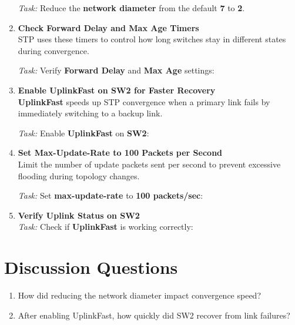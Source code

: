 \documentclass[a4paper]{book}
\begin{document}
\begin{enumerate}
    \textit{Task:} Reduce the \textbf{network diameter} from the default \textbf{7} to \textbf{2}.

    \item \textbf{Check Forward Delay and Max Age Timers} \\
    STP uses these timers to control how long switches stay in different states during convergence.

    \textit{Task:} Verify \textbf{Forward Delay} and \textbf{Max Age} settings:

    \item \textbf{Enable UplinkFast on SW2 for Faster Recovery} \\
    \textbf{UplinkFast} speeds up STP convergence when a primary link fails by immediately switching to a backup link.

    \textit{Task:} Enable \textbf{UplinkFast} on \textbf{SW2}:

    \item \textbf{Set Max-Update-Rate to 100 Packets per Second} \\
    Limit the number of update packets sent per second to prevent excessive flooding during topology changes.

    \textit{Task:} Set \textbf{max-update-rate} to \textbf{100 packets/sec}:


    \item \textbf{Verify Uplink Status on SW2} \\
    \textit{Task:} Check if \textbf{UplinkFast} is working correctly:

\end{enumerate}

\section*{Discussion Questions}

\begin{enumerate}
    \item How did reducing the network diameter impact convergence speed?
    \item After enabling UplinkFast, how quickly did SW2 recover from link failures?
\end{enumerate}
\end{document}
